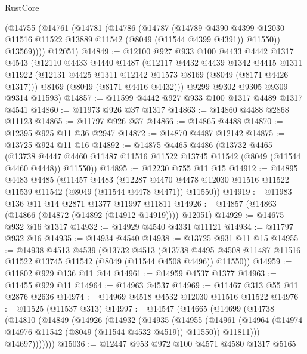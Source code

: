 \begin{lexlean}{RustCore}
\begin{coremodule}
      (@14755
        (@14761
          (@14781
            (@14786
              (@14787
                (@14789
                  @4390
                  @4399
                  @12030
                  @11516
                  @11522
                  @13889
                  @11542
                  (@8049 (@11544 @4399 @4391))
                  @11550))
              @13569))))
      @12051)
@14849 := @12100
    @927
    @933
    @100
    @4433
    @4442
    @1317
    @4543
    (@12110
      @4433
      @4440
      @1487
      (@12117
        @4432
        @4439
        @1342
        @4415
        @1311
        @11922
        (@12131 @4425 @1311 @12142 @11573 @8169 (@8049 (@8171 @4426 @1317)))
        @8169
        (@8049 (@8171 @4416 @4432)))
      @9299
      @9302
      @9305
      @9309
      @9314
      @11593)
@14857 := @11599 @4442 @927 @933 @100 @1317 @4489 @1317 @4541
@14860 := @11973 @926 @37 @1317
@14863 := @14860 @4488 @2868 @11123
@14865 := @11797 @926 @37
@14866 := @14865 @4488
@14870 := @12395 @925 @11 @36 @2947
@14872 := @14870 @4487 @12142
@14875 := @13725 @924 @11 @16
@14892 := @14875
    @4465
    @4486
    (@13732
      @4465
      (@13738 @4447 @4460 @11487 @11516 @11522 @13745 @11542 (@8049 (@11544 @4460 @4448)) @11550))
@14895 := @12230 @755 @11 @15
@14912 := @14895
    @4483
    @4485
    (@11457
      @4483
      (@12287 @4470 @4478 @12030 @11516 @11522 @11539 @11542 (@8049 (@11544 @4478 @4471)) @11550))
@14919 := @11983 @136 @11 @14 @2871 @1377 @11997 @11811
@14926 := @14857 (@14863 (@14866 (@14872 (@14892 (@14912 @14919)))) @12051)
@14929 := @14675 @932 @16 @1317
@14932 := @14929 @4540 @4331 @11121
@14934 := @11797 @932 @16
@14935 := @14934 @4540
@14938 := @13725 @931 @11 @15
@14955 := @14938
    @4513
    @4539
    (@13732
      @4513
      (@13738 @4495 @4508 @11487 @11516 @11522 @13745 @11542 (@8049 (@11544 @4508 @4496)) @11550))
@14959 := @11802 @929 @136 @11 @14
@14961 := @14959 @4537 @1377
@14963 := @11455 @929 @11
@14964 := @14963 @4537
@14969 := @11467 @313 @55 @11 @2876 @2636
@14974 := @14969 @4518 @4532 @12030 @11516 @11522
@14976 := @11525 (@11537 @313)
@14997 := @14547
    (@14665
      (@14699
        (@14738
          (@14810
            (@14849
              (@14926
                (@14932
                  (@14935
                    (@14955
                      (@14961
                        (@14964 (@14974 @14976 @11542 (@8049 (@11544 @4532 @4519)) @11550))
                        @11811)))
                  @14697)))))))
@15036 := @12447
    @953
    @972
    @100
    @4571
    @4580
    @1317
    @5165

\end{coremodule}
\end{lexlean}
